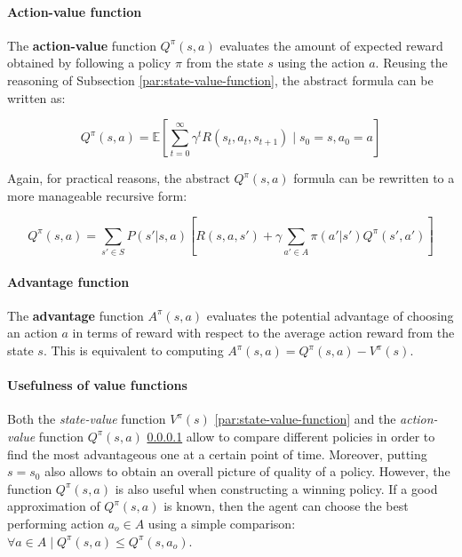 \paragraph{Action-value function}
\label{par:action-value-function}

The \textbf{action-value} function $Q^{\pi}(s, a)$ evaluates the amount of expected reward obtained by following a policy $\pi$ from the state $s$ using the action $a$.
Reusing the reasoning of Subsection \ref{par:state-value-function}, the abstract formula can be written as:

\begin{equation} \label{eq:Q-pi-E}
Q^\pi(s, a) = \mathbb{E} \left[ \sum_{t=0}^{\infty} \gamma^t R(s_t, a_t, s_{t+1}) \mid s_0 = s, a_0 = a \right]
\end{equation}

Again, for practical reasons, the abstract $Q^{\pi}(s, a)$ formula can be rewritten to a more manageable recursive form:

\begin{equation} \label{eq:Q-pi-bellman}
Q^{\pi}(s, a) = \sum _ {s' \in S} P(s' | s, a) \left[ R(s, a, s') + \gamma \sum _ {a' \in A} \pi (a' | s') Q^{\pi}(s', a') \right]
\end{equation}

\paragraph{Advantage function}

The \textbf{advantage} function $A^\pi(s, a)$ evaluates the potential advantage of choosing an action $a$ in terms of reward with respect to the average action reward from the state $s$. This is equivalent to computing $A^\pi(s, a) = Q^\pi(s, a) - V^\pi(s)$.

\paragraph{Usefulness of value functions}

Both the \textit{state-value} function $V^{\pi}(s)$ \ref{par:state-value-function} and the \textit{action-value} function $Q^{\pi}(s, a)$ \ref{par:action-value-function} allow to compare different policies in order to find the most advantageous one at a certain point of time. Moreover, putting $s = s_0$ also allows to obtain an overall picture of quality of a policy. However, the function $Q^{\pi}(s, a)$ is also useful when constructing a winning policy. If a good approximation of $Q^{\pi}(s, a)$ is known, then the agent can choose the best performing action $a_o \in A$ using a simple comparison: $\forall a \in A \; | \; Q^{\pi}(s, a) \leq Q^{\pi}(s, a_o)$.

